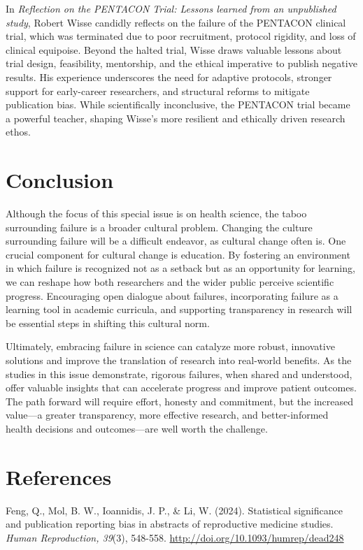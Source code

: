 \documentclass[authordate, empirical, issue]{jote-new-article}
\begin{document}
	In \emph{Reflection on the PENTACON Trial: Lessons learned from an unpublished study}, Robert Wisse candidly reflects on the failure of the PENTACON clinical trial, which was terminated due to poor recruitment, protocol rigidity, and loss of clinical equipoise. Beyond the halted trial, Wisse draws valuable lessons about trial design, feasibility, mentorship, and the ethical imperative to publish negative results. His experience underscores the need for adaptive protocols, stronger support for early-career researchers, and structural reforms to mitigate publication bias. While scientifically inconclusive, the PENTACON trial became a powerful teacher, shaping Wisse's more resilient and ethically driven research ethos.







	\section{Conclusion}
	Although the focus of this special issue is on health science, the taboo surrounding failure is a broader cultural problem. Changing the culture surrounding failure will be a difficult endeavor, as cultural change often is. One crucial component for cultural change is education. By fostering an environment in which failure is recognized not as a setback but as an opportunity for learning, we can reshape how both researchers and the wider public perceive scientific progress. Encouraging open dialogue about failures, incorporating failure as a learning tool in academic curricula, and supporting transparency in research will be essential steps in shifting this cultural norm.



	Ultimately, embracing failure in science can catalyze more robust, innovative solutions and improve the translation of research into real-world benefits. As the studies in this issue demonstrate, rigorous failures, when shared and understood, offer valuable insights that can accelerate progress and improve patient outcomes. The path forward will require effort, honesty and commitment, but the increased value—a greater transparency, more effective research, and better-informed health decisions and outcomes—are well worth the challenge.
	
	\section{References}
	Feng, Q., Mol, B. W., Ioannidis, J. P., \& Li, W. (2024). Statistical significance and publication reporting bias in abstracts of reproductive medicine studies. \emph{Human Reproduction, 39}(3), 548-558. \url{http://doi.org/10.1093/humrep/dead248}
	
\end{document}
